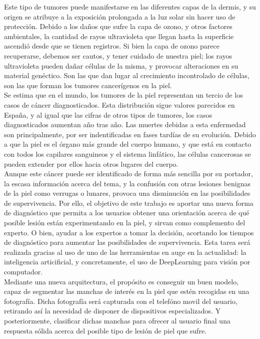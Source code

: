 Este tipo de tumores puede manifestarse en las diferentes capas de la dermis, y su origen se atribuye a la exposición prolongada a la luz solar sin hacer uso de protección. Debido a los daños que sufre la capa de ozono, y otros factores ambientales, la cantidad de rayos ultravioleta que llegan hasta la superficie ascendió desde que se tienen registros. Si bien la capa de ozono parece recuperarse, debemos ser cautos, y tener cuidado de nuestra piel; los rayos ultravioleta pueden dañar células de la misma, y provocar alteraciones en su material genéctico. Son las que dan lugar al crecimiento incontrolado de células, son las que forman los tumores cancerígenos en la piel.\\

Se estima que en el mundo, los tumores de la piel representan un tercio de los casos de cáncer diagnosticados. Esta distribución sigue valores parecidos en España, y al igual que las cifras de otros tipos de tumores, los casos diagnosticados aumentan año tras año. Las muertes debidas a esta enfermedad son principalmente, por ser indentificadas en fases tardías de su evolución. Debido a que la piel es el órgano más grande del cuerpo humano, y que está en contacto con todos los capilares sanguineos y el sistema linfático, las células cancerosas se pueden extender por ellos hacia otros lugares del cuerpo.\\

Aunque este cáncer puede ser identificado de forma más sencilla por su portador, la escasa información acerca del tema, y la confusión con otras lesiones benignas de la piel como verrugas o lunares, provoca una disminución en las posibilidades de supervivencia. Por ello, el objetivo de este trabajo es aportar una nueva forma de diagnóstico que permita a los usuarios obtener una orientación acerca de qué posible lesión están experimentando en la piel, y sirvan como complemento del experto. O bien, ayudar a los expertos a tomar la decisión, acortando los tiempos de diagnóstico para aumentar las posibilidades de supervivencia. Esta tarea será realizada gracias al uso de uno de las herramientas en auge en la actualidad: la inteligencia articificial, y concretamente, el uso de DeepLearning para visión por computador.\\
 
 Mediante una nueva arquitectura, el propósito es conseguir un buen modelo, capaz de segmentar las manchas de interés en la piel que estén recogidas en una fotografía. Dicha fotografía será capturada con el telefóno movil del usuario, retirando así la necesidad de disponer de dispositivos especializados. Y posteriormente, clasificar dichas manchas para ofrecer al usuario final una respuesta sólida acerca del posible tipo de lesión de piel que sufre.\\

